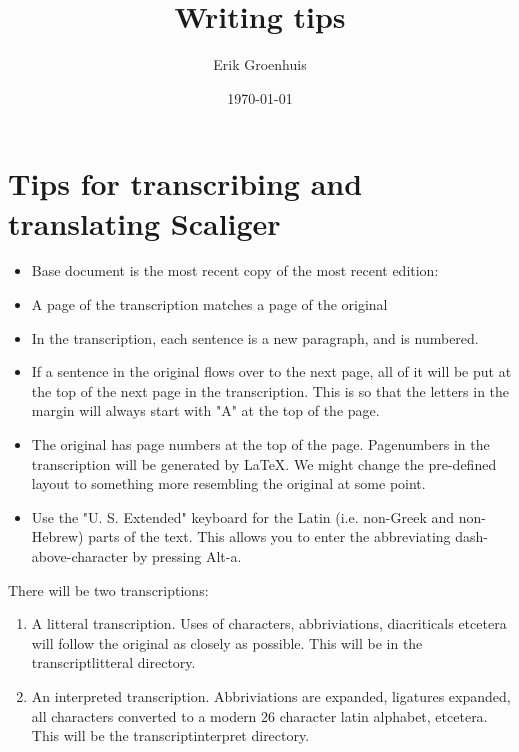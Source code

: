 \documentclass{report}
\title{Writing tips}
\author{Erik Groenhuis}
\date{\today}              %
\begin{document}
\maketitle

\tableofcontents{}




\chapter{Tips for transcribing and translating Scaliger}

\begin{itemize}
\item Base document is the most recent copy of the most recent edition:
\item A page of the transcription matches a page of the original
\item In the transcription, each sentence is a new paragraph, and is numbered.
\item If a sentence in the original flows over to the next page, all of it will be put at the top of the next page in the transcription.  This is so that the letters in the margin will always start with "A" at the top of the page.
\item The original has page numbers at the top of the page. Pagenumbers in the transcription will be generated by LaTeX. We might change the pre-defined layout to something more resembling the original at some point.
\item Use the "U. S. Extended" keyboard for the Latin (i.e. non-Greek and non-Hebrew) parts of the text. This allows you to enter the abbreviating dash-above-character by pressing Alt-a.
\end{itemize}

There will be two transcriptions:
\begin{enumerate}
\item A litteral transcription. Uses of characters, abbriviations, diacriticals etcetera will follow the original as closely as possible. This will be in the transcriptlitteral directory.
\item An interpreted transcription. Abbriviations are expanded, ligatures expanded, all characters converted to a modern 26 character latin alphabet, etcetera. This will be the transcriptinterpret directory.
\end{enumerate}
\end{document}
